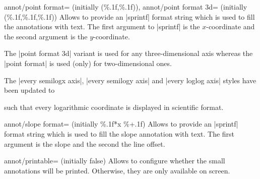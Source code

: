 \begin{pgfplotskeylist}{%
    annot/point format= (initially {(\%.1f,\%.1f)}),
    annot/point format 3d= (initially {(\%.1f,\%.1f,\%.1f)})%
}
    Allows to provide an |sprintf| format string which is used to fill the
    annotations with text. The first argument to |sprintf| is the
    $x$-coordinate and the second argument is the $y$-coordinate.

    The |point format 3d| variant is used for any three-dimensional axis
    whereas the |point format| is used (only) for two-dimensional ones.

    The |every semilogx axis|, |every semilogy axis| and |every loglog axis|
    styles have been updated to
\begin{codeexample}
\end{codeexample}
    \noindent such
    that every logarithmic coordinate is displayed in scientific
    format.
\end{pgfplotskeylist}

\begin{pgfplotskey}{annot/slope format= (initially \%.1f*x \%+.1f)}
    Allows to provide an |sprintf| format string which is used to fill the
    slope annotation with text. The first argument is the slope and the second
    the line offset.
\end{pgfplotskey}

\begin{pgfplotskey}{annot/printable= (initially false)}
    Allows to configure whether the small annotations will be printed.
    Otherwise, they are only available on screen.
\end{pgfplotskey}

